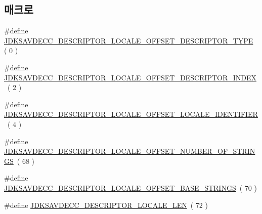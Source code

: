 \subsection*{매크로}
\begin{DoxyCompactItemize}
\item 
\#define \hyperlink{group__descriptor__locale_gac7f1bad509650852e3c7b3a8c0ddd57c}{J\+D\+K\+S\+A\+V\+D\+E\+C\+C\+\_\+\+D\+E\+S\+C\+R\+I\+P\+T\+O\+R\+\_\+\+L\+O\+C\+A\+L\+E\+\_\+\+O\+F\+F\+S\+E\+T\+\_\+\+D\+E\+S\+C\+R\+I\+P\+T\+O\+R\+\_\+\+T\+Y\+PE}~( 0 )
\item 
\#define \hyperlink{group__descriptor__locale_ga86c98fff1b622eb3cde98745a0edad51}{J\+D\+K\+S\+A\+V\+D\+E\+C\+C\+\_\+\+D\+E\+S\+C\+R\+I\+P\+T\+O\+R\+\_\+\+L\+O\+C\+A\+L\+E\+\_\+\+O\+F\+F\+S\+E\+T\+\_\+\+D\+E\+S\+C\+R\+I\+P\+T\+O\+R\+\_\+\+I\+N\+D\+EX}~( 2 )
\item 
\#define \hyperlink{group__descriptor__locale_gaad57dbf97564d1f30b2a411ab01c3149}{J\+D\+K\+S\+A\+V\+D\+E\+C\+C\+\_\+\+D\+E\+S\+C\+R\+I\+P\+T\+O\+R\+\_\+\+L\+O\+C\+A\+L\+E\+\_\+\+O\+F\+F\+S\+E\+T\+\_\+\+L\+O\+C\+A\+L\+E\+\_\+\+I\+D\+E\+N\+T\+I\+F\+I\+ER}~( 4 )
\item 
\#define \hyperlink{group__descriptor__locale_ga788c8d57da76731d3aea6057442a6f85}{J\+D\+K\+S\+A\+V\+D\+E\+C\+C\+\_\+\+D\+E\+S\+C\+R\+I\+P\+T\+O\+R\+\_\+\+L\+O\+C\+A\+L\+E\+\_\+\+O\+F\+F\+S\+E\+T\+\_\+\+N\+U\+M\+B\+E\+R\+\_\+\+O\+F\+\_\+\+S\+T\+R\+I\+N\+GS}~( 68 )
\item 
\#define \hyperlink{group__descriptor__locale_ga86d86810d4ea3cb299eec3d9cb6639b0}{J\+D\+K\+S\+A\+V\+D\+E\+C\+C\+\_\+\+D\+E\+S\+C\+R\+I\+P\+T\+O\+R\+\_\+\+L\+O\+C\+A\+L\+E\+\_\+\+O\+F\+F\+S\+E\+T\+\_\+\+B\+A\+S\+E\+\_\+\+S\+T\+R\+I\+N\+GS}~( 70 )
\item 
\#define \hyperlink{group__descriptor__locale_gaa79c61cd4ccd2cc3b8d73d8e8c17b48b}{J\+D\+K\+S\+A\+V\+D\+E\+C\+C\+\_\+\+D\+E\+S\+C\+R\+I\+P\+T\+O\+R\+\_\+\+L\+O\+C\+A\+L\+E\+\_\+\+L\+EN}~( 72 )
\end{DoxyCompactItemize}
